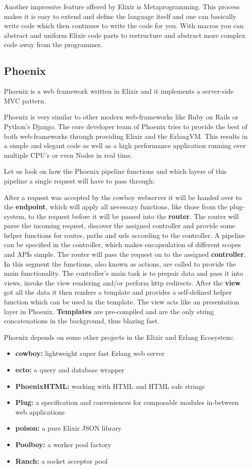 Another impressive feature offered by Elixir is Metaprogramming. This process makes it is easy to extend and define the language itself and one can basically write code which then continues to write the code for you. With macros you can abstract and uniform Elixir code parts to restructure and abstract more complex code away from the programmer. 
\subsection{Phoenix}
Phoenix is a web framework written in Elixir and it implements a server-side MVC pattern. 

Phoenix is very similar to other modern web-frameworks like Ruby on Rails or Python's Django. The core developer team of Phoenix tries to provide the best of both web-frameworks through providing Elixir and the ErlangVM. This results in a simple and elegant code as well as a high performance application running over multiple CPU's or even Nodes in real time. 

Let us look on how the Phoenix pipeline functions and which layers of this pipeline a single request will have to pass through: 


After a request was accepted by the cowboy webserver it will be handed over to the \textbf{endpoint}, which will apply all necessary functions, like those from the plug-system, to the request before it will be passed into the \textbf{router}. The router will parse the incoming request, discover the assigned controller and provide some helper functions for routes, paths and urls according to the controller. A pipeline can be specified in the controller, which makes encapsulation of different scopes and APIs simple. The router will pass the request on to the assigned \textbf{controller}. In this segment the functions, also known as actions, are called to provide the main functionality. The controller's main task is to prepair data and pass it into views, invoke the view rendering and/or perform http redirects. After the \textbf{view} got all the data it then renders a template and provides a self-defined helper function which can be used in the template. The view acts like an presentation layer in Phoenix. \textbf{Templates} are pre-compiled and are the only string concatenations in the background, thus blazing fast. 

Phoenix depends on some other projects in the Elixir and Erlang Ecosystem: 
\begin{itemize}
\item \textbf{cowboy:} lightweight super fast Erlang web server 
\item \textbf{ecto:} a query and database wrapper
\item \textbf{PhoenixHTML:} working with HTML and HTML safe strings
\item \textbf{Plug:} a specification and conveniences for composable modules in-between web applications
\item \textbf{poison:} a pure Elixir JSON library 
\item \textbf{Poolboy:} a worker pool factory 
\item \textbf{Ranch:} a socket acceptor pool
\end{itemize}

